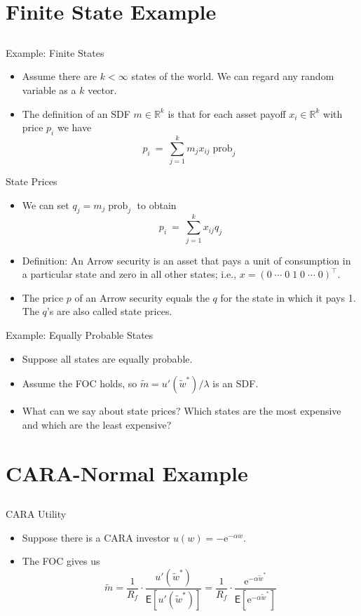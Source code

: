 \documentclass[10pt]{beamer}
\DeclareMathOperator{\prob}{prob}
\newcommand{\bi}{\begin{itemize}}
\newcommand{\ei}{\end{itemize}}
\newcommand{\im}{\item}
\newcommand{\E}{\mathrm{e}}
\newcommand{\mye}{\ensuremath{\mathsf{E}}}
\newcommand{\myreal}{\ensuremath{\mathbb{R}}}
\newcommand{\tw}{\tilde{w}}
\newcommand{\tm}{\tilde{m}}
\begin{document}
\section{Finite State Example}
\subsection{}

\begin{frame}{Example: Finite States}
\bi 
\im
Assume there are $k<\infty$ states of the world. We can regard any random variable as a $k$ vector.  

\im The definition of an SDF $m \in \myreal^k$ is that for each asset payoff $x_i \in \myreal^k$ with price $p_i$ we have
$$p_i \ = \ \sum_{j=1}^k m_jx_{ij} \prob_j $$
\ei
\end{frame}

\begin{frame}{State Prices}
    \bi 
    \im We can set $q_j = m_j\prob_j$ to obtain
$$p_i \ = \ \sum_{j=1}^k x_{ij}q_j$$
\im Definition: An Arrow security is an asset that pays a unit of consumption in a particular state and zero in all other states; i.e., $x = (0 \; \cdots \; 0 \; 1 \; 0 \; \cdots \; 0)^\top$.
\im The price $p$ of an Arrow security equals the $q$ for the state in which it pays 1.  The $q$'s are also called state prices.
\ei 
\end{frame}

\begin{frame}{Example: Equally Probable States}
    \bi
    \im Suppose all states are equally probable.
    \im Assume the FOC holds, so $\tm = u'(\tw^*)/\lambda$ is an SDF.
    \im What can we say about state prices?  Which states are the most expensive and which are the least expensive?
\ei 
\end{frame}


\section{CARA-Normal Example}
\subsection{}

\begin{frame}{CARA Utility}
    \bi 
    \im Suppose there is a CARA investor $u(w) = - \E^{-\alpha w}$.
    \im The FOC gives us 
    $$\tm =  \frac{1}{R_f} \cdot \frac{u'(\tw^*)}{\mye[u'(\tw^*)]} = \frac{1}{R_f} \cdot \frac{\E^{-\alpha \tw^*}}{\mye[\E^{-\alpha \tw^*}]}$$
    \ei
\end{frame}
\end{document}
